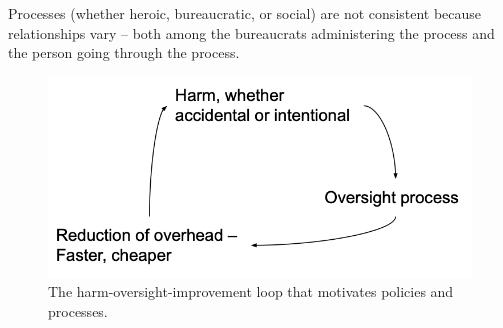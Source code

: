 Processes (whether heroic, bureaucratic, or social) are not consistent because relationships vary -- both among the bureaucrats administering the process and the person going through the process.






\begin{figure}
    \centering
    \includegraphics{images/process_loop_harm-oversight-improvement}
    \caption{The harm-oversight-improvement loop that motivates policies and processes.}
    \label{fig:harm-oversight-improvement}
\end{figure}











